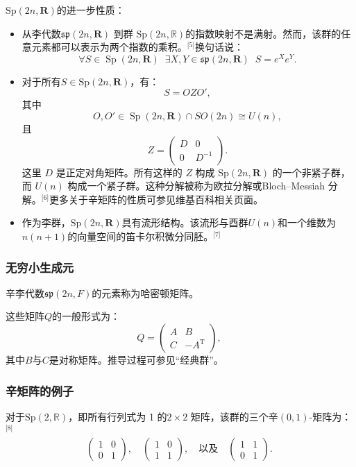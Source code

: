 $\mathrm{Sp}(2n, \mathbf{R})$的进一步性质：
\begin{itemize}
\item 从李代数$\mathfrak{sp}(2n, \mathbf{R})$ 到群 $\mathrm{Sp}(2n, \mathbb{R})$的指数映射不是满射。然而，该群的任意元素都可以表示为两个指数的乘积。\(^\text{[5]}\)换句话说：
   $$
   \forall S \in \operatorname{Sp}(2n,\mathbf{R}) \;\; \exists X, Y \in \mathfrak{sp}(2n,\mathbf{R}) \;\; S = e^{X} e^{Y}.~
   $$
\item 对于所有$S \in \mathrm{Sp}(2n, \mathbf{R})$，有：
   $$
   S = O Z O',~
   $$
   其中
   $$
   O, O' \in \operatorname{Sp}(2n, \mathbf{R}) \cap SO(2n) \cong U(n),~
   $$
   且
   $$
   Z = \begin{pmatrix} D & 0 \\ 0 & D^{-1} \end{pmatrix}.~
   $$
   这里 $D$ 是正定对角矩阵。所有这样的 $Z$ 构成 $\mathrm{Sp}(2n, \mathbf{R})$ 的一个非紧子群，而 $U(n)$ 构成一个紧子群。这种分解被称为欧拉分解或Bloch–Messiah 分解。\(^\text{[6]}\)更多关于辛矩阵的性质可参见维基百科相关页面。
\item 作为李群，$\mathrm{Sp}(2n, \mathbf{R})$具有流形结构。该流形与酉群$U(n)$和一个维数为$n(n+1)$的向量空间的笛卡尔积微分同胚。\(^\text{[7]}\)
\end{itemize}
\subsubsection{无穷小生成元}
辛李代数$\mathfrak{sp}(2n, F)$的元素称为哈密顿矩阵。

这些矩阵$Q$的一般形式为：
$$
Q = 
\begin{pmatrix}
A & B \\
C & -A^{\mathrm{T}}
\end{pmatrix},~
$$
其中$B$与$C$是对称矩阵。推导过程可参见“经典群”。
\subsubsection{辛矩阵的例子}
对于$\mathrm{Sp}(2, \mathbb{R})$，即所有行列式为 1 的$2 \times 2$ 矩阵，该群的三个辛$(0,1)$-矩阵为：\(^\text{[8]}\)
$$
\begin{pmatrix}
1 & 0 \\
0 & 1
\end{pmatrix}, \quad
\begin{pmatrix}
1 & 0 \\
1 & 1
\end{pmatrix}, \quad
\text{以及} \quad
\begin{pmatrix}
1 & 1 \\
0 & 1
\end{pmatrix}.~
$$
